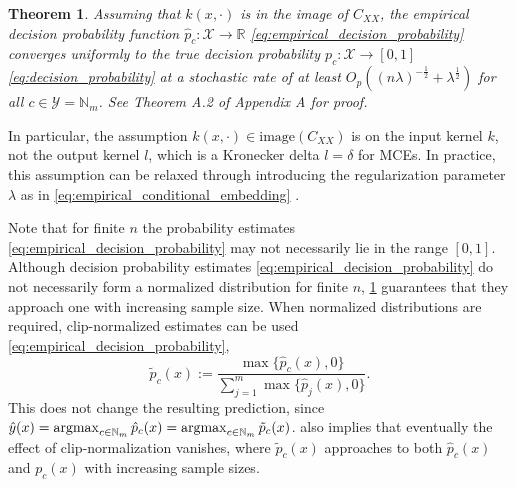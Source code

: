 \documentclass[twoside]{article}
\newtheorem{theorem}{Theorem}[section]
\newcommand{\argmax}{\operatornamewithlimits{argmax}}
\begin{document}


		\begin{theorem}
			\label{thm:probability_convergence_copy}
			Assuming that $k(x, \cdot)$ is in the image of $C_{XX}$, the empirical decision probability function $\hat{p}_{c} : \mathcal{X} \to \mathbb{R}$ \eqref{eq:empirical_decision_probability} converges uniformly to the true decision probability $p_{c} : \mathcal{X} \to [0, 1]$ \eqref{eq:decision_probability} at a stochastic rate of at least $O_{p}((n \lambda)^{-\frac{1}{2}} + \lambda^{\frac{1}{2}})$ for all $c \in \mathcal{Y} = \mathbb{N}_{m}$. See Theorem A.2 of Appendix A for proof.
		\end{theorem}
		
		In particular, the assumption $k(x, \cdot) \in \mathrm{image}(C_{XX})$ is on the input kernel $k$, not the output kernel $l$, which is a Kronecker delta $l = \delta$ for \glspl{MCE}. In practice, this assumption can be relaxed through introducing the regularization parameter $\lambda$ as in \eqref{eq:empirical_conditional_embedding} \citep{song2009hilbert}.
				
		Note that for finite $n$ the probability estimates \eqref{eq:empirical_decision_probability} may not necessarily lie in the range $[0,1]$. Although decision probability estimates \eqref{eq:empirical_decision_probability} do not necessarily form a normalized distribution for finite $n$, \cref{thm:probability_convergence_copy} guarantees that they approach one with increasing sample size. When normalized distributions are required, clip-normalized estimates can be used \eqref{eq:empirical_decision_probability},
		\begin{equation}
		\tilde{p}_{c}(x) := \frac{\max\{\hat{p}_{c}(x), 0\}}{\sum_{j = 1}^{m} \max\{\hat{p}_{j}(x), 0\}}.
		\label{eq:empirical_decision_probability_clip_normalized}
		\end{equation}
		This does not change the resulting prediction, since $\hat{y}(x) = \argmax_{c \in \mathbb{N}_{m}} \hat{p}_{c}(x) = \argmax_{c \in \mathbb{N}_{m}} \tilde{p}_{c}(x)$.  also implies that eventually the effect of clip-normalization vanishes, where $\tilde{p}_{c}(x)$ approaches to both $\hat{p}_{c}(x)$ and $p_{c}(x)$ with increasing sample sizes.
		
\end{document}
